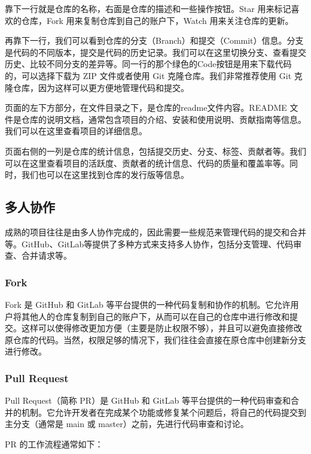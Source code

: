 \documentclass[../main.tex]{subfiles}
\begin{document}
靠下一行就是仓库的名称，右面是仓库的描述和一些操作按钮。Star 用来标记喜欢的仓库，Fork 用来复制仓库到自己的账户下，Watch 用来关注仓库的更新。

再靠下一行，我们可以看到仓库的分支（Branch）和提交（Commit）信息。分支是代码的不同版本，提交是代码的历史记录。我们可以在这里切换分支、查看提交历史、比较不同分支的差异等。同一行的那个绿色的Code按钮是用来下载代码的，可以选择下载为 ZIP 文件或者使用 Git 克隆仓库。我们非常推荐使用 Git 克隆仓库，因为这样可以更方便地管理代码和提交。

页面的左下方部分，在文件目录之下，是仓库的readme文件内容。README 文件是仓库的说明文档，通常包含项目的介绍、安装和使用说明、贡献指南等信息。我们可以在这里查看项目的详细信息。

页面右侧的一列是仓库的统计信息，包括提交历史、分支、标签、贡献者等。我们可以在这里查看项目的活跃度、贡献者的统计信息、代码的质量和覆盖率等。同时，我们也可以在这里找到仓库的发行版等信息。

\subsection{多人协作}

成熟的项目往往是由多人协作完成的，因此需要一些规范来管理代码的提交和合并等。GitHub、GitLab等提供了多种方式来支持多人协作，包括分支管理、代码审查、合并请求等。

\subsubsection{Fork}

Fork 是 GitHub 和 GitLab 等平台提供的一种代码复制和协作的机制。它允许用户将其他人的仓库复制到自己的账户下，从而可以在自己的仓库中进行修改和提交。这样可以使得修改更加方便（主要是防止权限不够），并且可以避免直接修改原仓库的代码。当然，权限足够的情况下，我们往往会直接在原仓库中创建新分支进行修改。

\subsubsection{Pull Request}\label{sec:pull-request}
Pull Request（简称 PR）是 GitHub 和 GitLab 等平台提供的一种代码审查和合并的机制。它允许开发者在完成某个功能或修复某个问题后，将自己的代码提交到主分支（通常是 main 或 master）之前，先进行代码审查和讨论。

PR 的工作流程通常如下：
\end{document}
